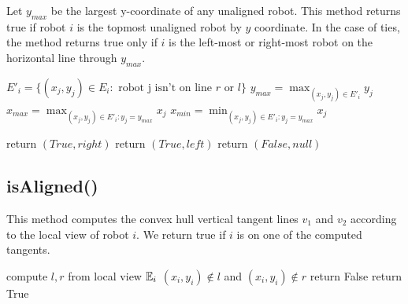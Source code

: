 \documentclass[preprint,10pt]{elsarticle}
\begin{document}
	Let $y_{max}$ be the largest y-coordinate of any unaligned robot. 
	This method returns true if robot $i$ is the topmost unaligned robot by $y$ coordinate. In the
	case of ties, the method returns true only if $i$ is the left-most or right-most 
	robot on the horizontal line through $y_{max}$.

\begin{algorithm}[H]
\begin{algorithmic}[1]
	\State $E'_i = \{ (x_j, y_j) \in E_i : \text{ robot j isn't on line } r \text{ or } l\}$
	\State $y_{max} = \max_{(x_j, y_j) \in E'_i}{y_j}$ 
	\State $x_{max} = \max_{(x_j, y_j) \in E'_i : y_j = y_{max} }{x_j}$ 
	\State $x_{min} = \min_{(x_j, y_j) \in E'_i : y_j = y_{max} }{x_j}$ 

		\State return $(True, right)$
		\State return $(True, left)$
	\Else
		\State return $(False, null)$
	\EndIf

\EndProcedure
\end{algorithmic}
\end{algorithm}

\subsection{isAligned()} 

	This method computes the convex hull vertical tangent lines $v_1$ and $v_2$ according
	to the local view of robot $i$. We return true if $i$ is on one of the 
	computed tangents.
\begin{algorithm}[H]
\begin{algorithmic}[1]
	\State compute $l,r$ from local view $\mathbb{E}_i$
	\If $(x_i, y_i) \notin  l$ and $(x_i, y_i) \notin r$
		\State return False
	\Else 
		\State return True
	\EndIf
\EndProcedure
\end{algorithmic}
\end{algorithm}
\end{document}
